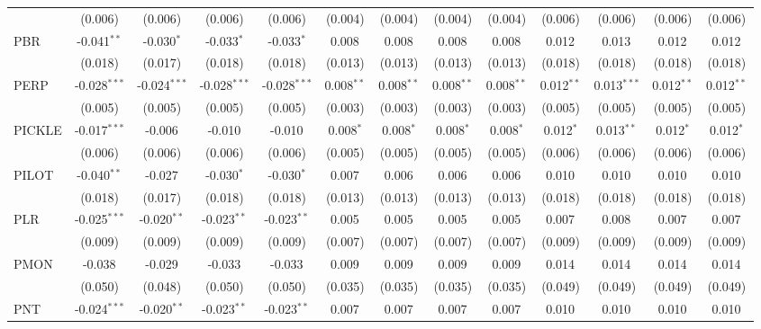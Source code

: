 \begin{table}[!htbp]
\begin{tabular}{@{\extracolsep{5pt}}lcccccccccccc}
  & (0.006) & (0.006) & (0.006) & (0.006) & (0.004) & (0.004) & (0.004) & (0.004) & (0.006) & (0.006) & (0.006) & (0.006) \\
 PBR & -0.041$^{**}$ & -0.030$^{*}$ & -0.033$^{*}$ & -0.033$^{*}$ & 0.008$^{}$ & 0.008$^{}$ & 0.008$^{}$ & 0.008$^{}$ & 0.012$^{}$ & 0.013$^{}$ & 0.012$^{}$ & 0.012$^{}$ \\
  & (0.018) & (0.017) & (0.018) & (0.018) & (0.013) & (0.013) & (0.013) & (0.013) & (0.018) & (0.018) & (0.018) & (0.018) \\
 PERP & -0.028$^{***}$ & -0.024$^{***}$ & -0.028$^{***}$ & -0.028$^{***}$ & 0.008$^{**}$ & 0.008$^{**}$ & 0.008$^{**}$ & 0.008$^{**}$ & 0.012$^{**}$ & 0.013$^{***}$ & 0.012$^{**}$ & 0.012$^{**}$ \\
  & (0.005) & (0.005) & (0.005) & (0.005) & (0.003) & (0.003) & (0.003) & (0.003) & (0.005) & (0.005) & (0.005) & (0.005) \\
 PICKLE & -0.017$^{***}$ & -0.006$^{}$ & -0.010$^{}$ & -0.010$^{}$ & 0.008$^{*}$ & 0.008$^{*}$ & 0.008$^{*}$ & 0.008$^{*}$ & 0.012$^{*}$ & 0.013$^{**}$ & 0.012$^{*}$ & 0.012$^{*}$ \\
  & (0.006) & (0.006) & (0.006) & (0.006) & (0.005) & (0.005) & (0.005) & (0.005) & (0.006) & (0.006) & (0.006) & (0.006) \\
 PILOT & -0.040$^{**}$ & -0.027$^{}$ & -0.030$^{*}$ & -0.030$^{*}$ & 0.007$^{}$ & 0.006$^{}$ & 0.006$^{}$ & 0.006$^{}$ & 0.010$^{}$ & 0.010$^{}$ & 0.010$^{}$ & 0.010$^{}$ \\
  & (0.018) & (0.017) & (0.018) & (0.018) & (0.013) & (0.013) & (0.013) & (0.013) & (0.018) & (0.018) & (0.018) & (0.018) \\
 PLR & -0.025$^{***}$ & -0.020$^{**}$ & -0.023$^{**}$ & -0.023$^{**}$ & 0.005$^{}$ & 0.005$^{}$ & 0.005$^{}$ & 0.005$^{}$ & 0.007$^{}$ & 0.008$^{}$ & 0.007$^{}$ & 0.007$^{}$ \\
  & (0.009) & (0.009) & (0.009) & (0.009) & (0.007) & (0.007) & (0.007) & (0.007) & (0.009) & (0.009) & (0.009) & (0.009) \\
 PMON & -0.038$^{}$ & -0.029$^{}$ & -0.033$^{}$ & -0.033$^{}$ & 0.009$^{}$ & 0.009$^{}$ & 0.009$^{}$ & 0.009$^{}$ & 0.014$^{}$ & 0.014$^{}$ & 0.014$^{}$ & 0.014$^{}$ \\
  & (0.050) & (0.048) & (0.050) & (0.050) & (0.035) & (0.035) & (0.035) & (0.035) & (0.049) & (0.049) & (0.049) & (0.049) \\
 PNT & -0.024$^{***}$ & -0.020$^{**}$ & -0.023$^{**}$ & -0.023$^{**}$ & 0.007$^{}$ & 0.007$^{}$ & 0.007$^{}$ & 0.007$^{}$ & 0.010$^{}$ & 0.010$^{}$ & 0.010$^{}$ & 0.010$^{}$ \\

\end{tabular}
\end{table}
